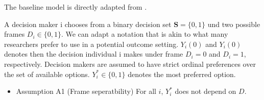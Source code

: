 The baseline model is directly adapted from \cite{acquisti2015privacy}.

A decision maker i chooses from a binary decision set $ \textbf{S} = \lbrace 0,1 \rbrace  $ und two possible frames $ D_{i} \in \lbrace 0,1 \rbrace $. 
We can adapt a notation that is akin to what many researchers prefer to use in a potential outcome setting. $ Y_{i}(0) $ and $ Y_{i}(0) $ denotes then the decision individual i makes under frame $ D_{i} = 0 $ and $ D_{i} = 1 $, respectively.
Decision makers are assumed to have strict ordinal preferences over the set of available options. $ Y^{*}_{i} \in \lbrace 0,1 \rbrace $ denotes the most preferred option.  


\begin{itemize}
    \item Assumption A1 (Frame seperatbility) For all $ i $, $ Y^*_{i} $ does not depend on $ D $.
\end{itemize}

